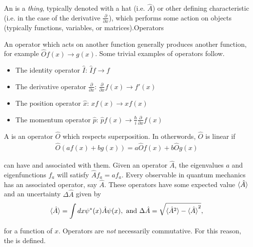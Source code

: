 \begin{defn}{1}
	An  is a \textit{thing}, typically denoted with a hat (i.e. $\hat{A}$) or other defining characteristic (i.e. in the case of the derivative $\frac{\partial}{\partial x}$), which performs some action on objects (typically functions, variables, or matrices).Operators
\end{defn}

An operator which acts on another function generally produces another function, for example $\hat{O}f(x) \rightarrow g(x)$. Some trivial examples of operators follow.

\begin{itemize}
	\item The identity operator $\hat{I}$: $\hat{I}f \rightarrow f$
	\item The derivative operator $\frac{\partial}{\partial x}$: $\frac{\partial}{\partial x}f(x) \rightarrow f'(x)$
	\item The position operator $\hat{x}$: $\hat{x}f(x) \rightarrow xf(x)$
	\item The momentum operator $\hat{p}$: $\hat{p}f(x) \rightarrow \frac{\hbar}{i}\frac{\partial}{\partial x}f(x)$ \label{test}
\end{itemize}

\begin{defn}{1}
	A  is an operator $\hat{O}$ which respects superposition. In otherwords, $\hat{O}$ is linear if 
\begin{align}
\hat{O}(af(x)+bg(x)) = a\hat{O}f(x)+b\hat{O}g(x)
\end{align}	
\end{defn}

 can have  and  associated with them. Given an operator $\hat{A}$, the eigenvalues $a$ and eigenfunctions $f_a$ will satisfy $\hat{A}f_a = af_a$. Every observable in quantum mechanics has an associated operator, say $\hat{A}$. These operators have some expected value $\braket{\hat{A}}$ and an uncertainty $\Delta \hat{A}$ given by
\begin{align}
\braket{\hat{A}} = \int dx \psi^*(x)\hat{A}\psi(x), \text{  and  } \Delta \hat{A} = \sqrt{\braket{\hat{A}^2} - \braket{\hat{A}}^2},
\end{align}

for a function of $x$. Operators are \textit{not} necessarily commutative. For this reason, the  is defined.

